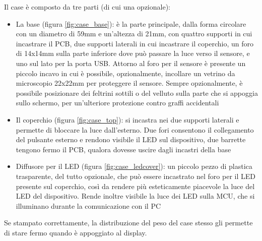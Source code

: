Il case è composto da tre parti (di cui una opzionale):
\begin{itemize}
	\item La base (figura \ref{fig:case_base}): è la parte principale, dalla forma circolare con un diametro di 59mm e un'altezza di 21mm, con quattro supporti in cui incastrare il PCB, due supporti laterali in cui incastrare il coperchio, un foro di 14x14mm sulla parte inferiore dove può passare la luce verso il sensore, e uno sul lato per la porta USB. Attorno al foro per il sensore è presente un piccolo incavo in cui è possibile, opzionalmente, incollare un vetrino da microscopio 22x22mm per proteggere il sensore. Sempre opzionalmente, è possibile posizionare dei feltrini sottili o del velluto sulla parte che si appoggia sullo schermo, per un'ulteriore protezione contro graffi accidentali
	\item Il coperchio (figura \ref{fig:case_top}): si incastra nei due supporti laterali e permette di bloccare la luce dall'esterno. Due fori consentono il collegamento del pulsante esterno e rendono visibile il LED sul dispositivo, due barrette tengono fermo il PCB, qualora dovesse uscire dagli incastri della base
	\item Diffusore per il LED (figura \ref{fig:case_ledcover}): un piccolo pezzo di plastica trasparente, del tutto opzionale, che può essere incastrato nel foro per il LED presente sul coperchio, così da rendere più esteticamente piacevole la luce del LED del dispositivo. Rende inoltre visibile la luce dei LED sulla MCU, che si illuminano durante la comunicazione con il PC
\end{itemize}

Se stampato correttamente, la distribuzione del peso del case stesso gli permette di stare fermo quando è appoggiato al display.

